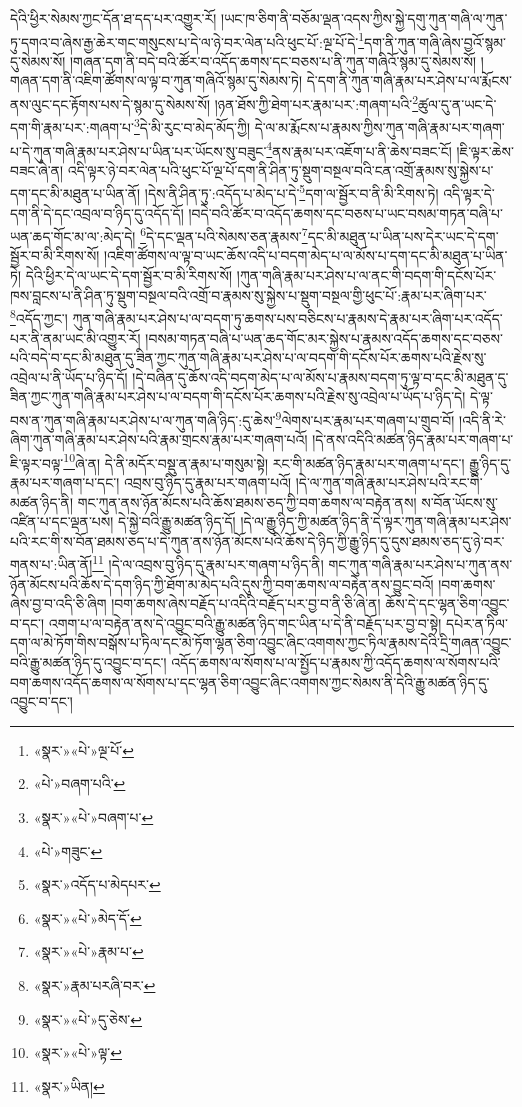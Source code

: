 དེའི་ཕྱིར་སེམས་ཀྱང་དོན་ཐ་དད་པར་འགྱུར་རོ། །ཡང་ཁ་ཅིག་ནི་བཅོམ་ལྡན་འདས་ཀྱིས་སྐྱེ་དགུ་ཀུན་གཞི་ལ་ཀུན་ཏུ་དགའ་བ་ཞེས་རྒྱ་ཆེར་གང་གསུངས་པ་དེ་ལ་ཉེ་བར་ལེན་པའི་ཕུང་པོ་:ལྔ་པོ་དེ་\footnote{«སྣར་»«པེ་»ལྔ་པོ་}དག་ནི་ཀུན་གཞི་ཞེས་བྱའོ་སྙམ་དུ་སེམས་སོ། །གཞན་དག་ནི་བདེ་བའི་ཚོར་བ་འདོད་ཆགས་དང་བཅས་པ་ནི་ཀུན་གཞིའོ་སྙམ་དུ་སེམས་སོ། །གཞན་དག་ནི་འཇིག་ཚོགས་ལ་ལྟ་བ་ཀུན་གཞིའོ་སྙམ་དུ་སེམས་ཏེ། དེ་དག་ནི་ཀུན་གཞི་རྣམ་པར་ཤེས་པ་ལ་རྨོངས་ནས་ལུང་དང་རྟོགས་པས་དེ་སྙམ་དུ་སེམས་སོ། །ཉན་ཐོས་ཀྱི་ཐེག་པར་རྣམ་པར་:གཞག་པའི་\footnote{«པེ་»བཞག་པའི་}ཚུལ་དུ་ན་ཡང་དེ་དག་གི་རྣམ་པར་:གཞག་པ་\footnote{«སྣར་»«པེ་»བཞག་པ་}དེ་མི་རུང་བ་མེད་མོད་ཀྱི། དེ་ལ་མ་རྨོངས་པ་རྣམས་ཀྱིས་ཀུན་གཞི་རྣམ་པར་གཞག་པ་དེ་ཀུན་གཞི་རྣམ་པར་ཤེས་པ་ཡིན་པར་ཡོངས་སུ་བཟུང་\footnote{«པེ་»གཟུང་}ནས་རྣམ་པར་འཇོག་པ་ནི་ཆེས་བཟང་ངོ། །ཇི་ལྟར་ཆེས་བཟང་ཞེ་ན། འདི་ལྟར་ཉེ་བར་ལེན་པའི་ཕུང་པོ་ལྔ་པོ་དག་ནི་ཤིན་ཏུ་སྡུག་བསྔལ་བའི་ངན་འགྲོ་རྣམས་སུ་སྐྱེས་པ་དག་དང་མི་མཐུན་པ་ཡིན་ནོ། །དེས་ནི་ཤིན་ཏུ་:འདོད་པ་མེད་པ་དེ་\footnote{«སྣར་»འདོད་པ་མེདཔར་}དག་ལ་སྦྱོར་བ་ནི་མི་རིགས་ཏེ། འདི་ལྟར་དེ་དག་ནི་དེ་དང་འབྲལ་བ་ཉིད་དུ་འདོད་དོ། །བདེ་བའི་ཚོར་བ་འདོད་ཆགས་དང་བཅས་པ་ཡང་བསམ་གཏན་བཞི་པ་ཡན་ཆད་གོང་མ་ལ་:མེད་དེ། \footnote{«སྣར་»«པེ་»མེད་དོ་}དེ་དང་ལྡན་པའི་སེམས་ཅན་རྣམས་\footnote{«སྣར་»«པེ་»རྣམ་པ་}དང་མི་མཐུན་པ་ཡིན་པས་དེར་ཡང་དེ་དག་སྦྱོར་བ་མི་རིགས་སོ། །འཇིག་ཚོགས་ལ་ལྟ་བ་ཡང་ཆོས་འདི་པ་བདག་མེད་པ་ལ་མོས་པ་དག་དང་མི་མཐུན་པ་ཡིན་ཏེ། དེའི་ཕྱིར་དེ་ལ་ཡང་དེ་དག་སྦྱོར་བ་མི་རིགས་སོ། །ཀུན་གཞི་རྣམ་པར་ཤེས་པ་ལ་ནང་གི་བདག་གི་དངོས་པོར་ཁས་བླངས་པ་ནི་ཤིན་ཏུ་སྡུག་བསྔལ་བའི་འགྲོ་བ་རྣམས་སུ་སྐྱེས་པ་སྡུག་བསྔལ་གྱི་ཕུང་པོ་:རྣམ་པར་ཞིག་པར་\footnote{«སྣར་»རྣམ་པརཞི་བར་}འདོད་ཀྱང་། ཀུན་གཞི་རྣམ་པར་ཤེས་པ་ལ་བདག་ཏུ་ཆགས་པས་བཅིངས་པ་རྣམས་དེ་རྣམ་པར་ཞིག་པར་འདོད་པར་ནི་ནམ་ཡང་མི་འགྱུར་རོ། །བསམ་གཏན་བཞི་པ་ཡན་ཆད་གོང་མར་སྐྱེས་པ་རྣམས་འདོད་ཆགས་དང་བཅས་པའི་བདེ་བ་དང་མི་མཐུན་དུ་ཟིན་ཀྱང་ཀུན་གཞི་རྣམ་པར་ཤེས་པ་ལ་བདག་གི་དངོས་པོར་ཆགས་པའི་རྗེས་སུ་འབྲེལ་པ་ནི་ཡོད་པ་ཉིད་དོ། །དེ་བཞིན་དུ་ཆོས་འདི་བདག་མེད་པ་ལ་མོས་པ་རྣམས་བདག་ཏུ་ལྟ་བ་དང་མི་མཐུན་དུ་ཟིན་ཀྱང་ཀུན་གཞི་རྣམ་པར་ཤེས་པ་ལ་བདག་གི་དངོས་པོར་ཆགས་པའི་རྗེས་སུ་འབྲེལ་པ་ཡོད་པ་ཉིད་དེ། དེ་ལྟ་བས་ན་ཀུན་གཞི་རྣམ་པར་ཤེས་པ་ལ་ཀུན་གཞི་ཉིད་:དུ་ཆེས་\footnote{«སྣར་»«པེ་»དུ་ཅེས་}ལེགས་པར་རྣམ་པར་གཞག་པ་གྲུབ་བོ། །འདི་ནི་རེ་ཞིག་ཀུན་གཞི་རྣམ་པར་ཤེས་པའི་རྣམ་གྲངས་རྣམ་པར་གཞག་པའོ། །དེ་ནས་འདིའི་མཚན་ཉིད་རྣམ་པར་གཞག་པ་ཇི་ལྟར་བལྟ་\footnote{«སྣར་»«པེ་»ལྟ་}ཞེ་ན། དེ་ནི་མདོར་བསྡུ་ན་རྣམ་པ་གསུམ་སྟེ། རང་གི་མཚན་ཉིད་རྣམ་པར་གཞག་པ་དང་། རྒྱུ་ཉིད་དུ་རྣམ་པར་གཞག་པ་དང་། འབྲས་བུ་ཉིད་དུ་རྣམ་པར་གཞག་པའོ། །དེ་ལ་ཀུན་གཞི་རྣམ་པར་ཤེས་པའི་རང་གི་མཚན་ཉིད་ནི། གང་ཀུན་ནས་ཉོན་མོངས་པའི་ཆོས་ཐམས་ཅད་ཀྱི་བག་ཆགས་ལ་བརྟེན་ནས། ས་བོན་ཡོངས་སུ་འཛིན་པ་དང་ལྡན་པས། དེ་སྐྱེ་བའི་རྒྱུ་མཚན་ཉིད་དོ། །དེ་ལ་རྒྱུ་ཉིད་ཀྱི་མཚན་ཉིད་ནི་དེ་ལྟར་ཀུན་གཞི་རྣམ་པར་ཤེས་པའི་རང་གི་ས་བོན་ཐམས་ཅད་པ་དེ་ཀུན་ནས་ཉོན་མོངས་པའི་ཆོས་དེ་ཉིད་ཀྱི་རྒྱུ་ཉིད་དུ་དུས་ཐམས་ཅད་དུ་ཉེ་བར་གནས་པ་:ཡིན་ནོ།\footnote{«སྣར་»ཡིན།} །དེ་ལ་འབྲས་བུ་ཉིད་དུ་རྣམ་པར་གཞག་པ་ཉིད་ནི། གང་ཀུན་གཞི་རྣམ་པར་ཤེས་པ་ཀུན་ནས་ཉོན་མོངས་པའི་ཆོས་དེ་དག་ཉིད་ཀྱི་ཐོག་མ་མེད་པའི་དུས་ཀྱི་བག་ཆགས་ལ་བརྟེན་ནས་བྱུང་བའོ། །བག་ཆགས་ཞེས་བྱ་བ་འདི་ཅི་ཞིག །བག་ཆགས་ཞེས་བརྗོད་པ་འདིའི་བརྗོད་པར་བྱ་བ་ནི་ཅི་ཞེ་ན། ཆོས་དེ་དང་ལྷན་ཅིག་འབྱུང་བ་དང་། འགག་པ་ལ་བརྟེན་ནས་དེ་འབྱུང་བའི་རྒྱུ་མཚན་ཉིད་གང་ཡིན་པ་དེ་ནི་བརྗོད་པར་བྱ་བ་སྟེ། དཔེར་ན་ཏིལ་དག་ལ་མེ་ཏོག་གིས་བསྒོས་པ་ཏིལ་དང་མེ་ཏོག་ལྷན་ཅིག་འབྱུང་ཞིང་འགགས་ཀྱང་ཏིལ་རྣམས་དེའི་དྲི་གཞན་འབྱུང་བའི་རྒྱུ་མཚན་ཉིད་དུ་འབྱུང་བ་དང་། འདོད་ཆགས་ལ་སོགས་པ་ལ་སྤྱོད་པ་རྣམས་ཀྱི་འདོད་ཆགས་ལ་སོགས་པའི་བག་ཆགས་འདོད་ཆགས་ལ་སོགས་པ་དང་ལྷན་ཅིག་འབྱུང་ཞིང་འགགས་ཀྱང་སེམས་ནི་དེའི་རྒྱུ་མཚན་ཉིད་དུ་འབྱུང་བ་དང་། 